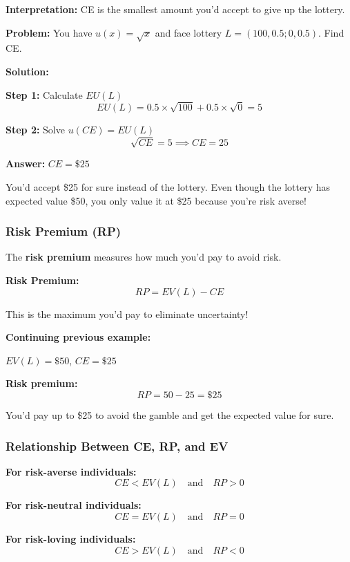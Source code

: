\documentclass[10pt,letterpaper]{article}
\begin{document}
\textbf{Interpretation:} CE is the smallest amount you'd accept to give up the lottery.

\begin{examplebox}
\textbf{Problem:} You have $u(x) = \sqrt{x}$ and face lottery $L = (100, 0.5; 0, 0.5)$. Find CE.

\textbf{Solution:}

\textbf{Step 1:} Calculate $EU(L)$
\[
EU(L) = 0.5 \times \sqrt{100} + 0.5 \times \sqrt{0} = 5
\]

\textbf{Step 2:} Solve $u(CE) = EU(L)$
\[
\sqrt{CE} = 5 \implies CE = 25
\]

\textbf{Answer:} $CE = \$25$

You'd accept \$25 for sure instead of the lottery. Even though the lottery has expected value \$50, you only value it at \$25 because you're risk averse!
\end{examplebox}

\subsubsection{Risk Premium (RP)}

The \textbf{risk premium} measures how much you'd pay to avoid risk.

\begin{formulabox}
\textbf{Risk Premium:}
\[
\boxed{RP = EV(L) - CE}
\]

This is the maximum you'd pay to eliminate uncertainty!
\end{formulabox}

\begin{examplebox}
\textbf{Continuing previous example:}

$EV(L) = \$50$, $CE = \$25$

\textbf{Risk premium:}
\[
RP = 50 - 25 = \boxed{\$25}
\]

You'd pay up to \$25 to avoid the gamble and get the expected value for sure.
\end{examplebox}

\subsubsection{Relationship Between CE, RP, and EV}

\begin{tcolorbox}[colback=blue!5,colframe=blue!70]
\textbf{For risk-averse individuals:}
\[
CE < EV(L) \quad \text{and} \quad RP > 0
\]

\textbf{For risk-neutral individuals:}
\[
CE = EV(L) \quad \text{and} \quad RP = 0
\]

\textbf{For risk-loving individuals:}
\[
CE > EV(L) \quad \text{and} \quad RP < 0
\]
\end{tcolorbox}
\end{document}

